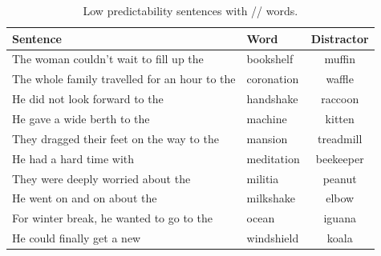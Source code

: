 \begin{table}[!ht]
\caption{Low predictability sentences with /\textesh/ words.}
\label{tbl:sentlowsh}
\small
\centering
\begin{tabular}{llc}
\toprule
Sentence                                                                     & Word        & Distractor  \\
\midrule
The woman couldn't wait to fill up the        & bookshelf  & muffin     \\
The whole family travelled for an hour to the & coronation & waffle     \\
He did not look forward to the                & handshake  & raccoon    \\
He gave a wide berth to the                   & machine    & kitten     \\
They dragged their feet on the way to the     & mansion    & treadmill  \\
He had a hard time with                       & meditation & beekeeper  \\
They were deeply worried about the            & militia    & peanut     \\
He went on and on about the                   & milkshake  & elbow      \\
For winter break, he wanted to go to the      & ocean      & iguana     \\
He could finally get a new                    & windshield & koala     \\
\bottomrule
\end{tabular}
\end{table}

